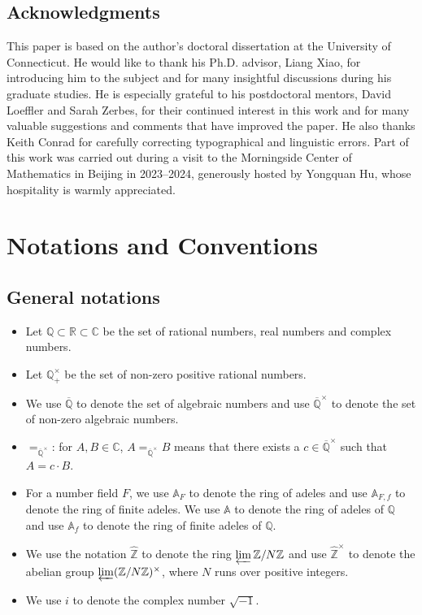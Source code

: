 \documentclass[11pt, a4paper]{amsart}
\theoremstyle{plain}
\theoremstyle{definition}
\numberwithin{equation}{section}
\def\AAA{\mathbb{A}}
\def\CC{\mathbb{C}}
\def\QQ{\mathbb{Q}}
\def\RR{\mathbb{R}}
\def\ZZ{\mathbb{Z}}
\begin{document}
\subsection*{Acknowledgments}
This paper is based on the author’s doctoral dissertation at the University of Connecticut. He would like to thank his Ph.D. advisor, Liang Xiao, for introducing him to the subject and for many insightful discussions during his graduate studies. He is especially grateful to his postdoctoral mentors, David Loeffler and Sarah Zerbes, for their continued interest in this work and for many valuable suggestions and comments that have improved the paper. He also thanks Keith Conrad for carefully correcting typographical and linguistic errors. Part of this work was carried out during a visit to the Morningside Center of Mathematics in Beijing in 2023{--}2024, generously hosted by Yongquan Hu, whose hospitality is warmly appreciated.



\section{Notations and Conventions}
\subsection*{General notations}

\begin{itemize}
    \item Let $\QQ \subset \RR \subset \CC$ be the set of rational numbers, real numbers and complex numbers. 
    \item Let $\QQ^{\times}_{+}$ be the set of non-zero positive rational numbers. 
    \item We use $\overline{\QQ}$ to denote the set of algebraic numbers and use $\overline{\QQ}^{\times}$ to denote the set of non-zero algebraic numbers. 
    \item $=_{\overline{\QQ}^{\times}}$: for $A, B \in \CC$, $A =_{\overline{\QQ}^{\times}} B$ means that there exists a $c \in \overline{\QQ}^{\times}$ such that $A = c \cdot B$. 
    \item For a number field $F$, we use $\AAA_{F}$ to denote the ring of adeles and use $\AAA_{F, f}$ to denote the ring of finite adeles. We use $\AAA$ to denote the ring of adeles of $\QQ$ and use $\AAA_{f}$ to denote the ring of finite adeles of $\QQ$.
    \item We use the notation $\hat{\ZZ}$ to denote the ring $\varprojlim \ZZ / N \ZZ$ and use $\hat{\ZZ}^{\times}$ to denote the abelian group $\varprojlim (\ZZ / N \ZZ)^{\times}$, where $N$ runs over positive integers.
    \item We use $i$ to denote the complex number $\sqrt{-1}$.
\end{itemize}
\end{document}
